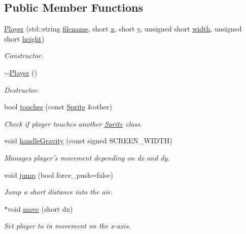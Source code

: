 \subsection*{Public Member Functions}
\begin{DoxyCompactItemize}
\item 
\hyperlink{classPlayer_a2a29c6c2f8635be96415c46c95881954}{Player} (std\-::string \hyperlink{classSprite_aae3514a9a1f77ab5e8e213e44ec618a3}{filename}, short \hyperlink{classSprite_a18eb1c5b90418641d3eabda8f7fe56c9}{x}, short \hyperlink{classSprite_afca2c03aad9d2526427470688ae76439}{y}, unsigned short \hyperlink{classSprite_ac56c9242f797a1a2f76687fca636a3c4}{width}, unsigned short \hyperlink{classSprite_ae96d42c46af7aad1f9031da62f878b21}{height})
\begin{DoxyCompactList}\small\item\em Constructor. \end{DoxyCompactList}\item 
\hyperlink{classPlayer_a749d2c00e1fe0f5c2746f7505a58c062}{$\sim$\-Player} ()
\begin{DoxyCompactList}\small\item\em Destructor. \end{DoxyCompactList}\item 
bool \hyperlink{classPlayer_a83bceadff4531bcd4d8a1112bdd9761c}{touches} (const \hyperlink{classSprite}{Sprite} \&other)
\begin{DoxyCompactList}\small\item\em Check if player touches another \hyperlink{classSprite}{Sprite} class. \end{DoxyCompactList}\item 
void \hyperlink{classPlayer_a27fc37febc547d8d030b24ddae6c10cf}{handle\-Gravity} (const signed S\-C\-R\-E\-E\-N\-\_\-\-W\-I\-D\-T\-H)
\begin{DoxyCompactList}\small\item\em Manages player's movement depending on dx and dy. \end{DoxyCompactList}\item 
void \hyperlink{classPlayer_a1304b1190f969212483e81ae85e86282}{jump} (bool force\-\_\-push=false)
\begin{DoxyCompactList}\small\item\em Jump a short distance into the air. \end{DoxyCompactList}\item 
$\ast$void \hyperlink{classPlayer_ae9c07ea7f8980451fc2070bb5a76f06f}{move} (short dx)
\begin{DoxyCompactList}\small\item\em Set player to in movement on the x-\/axis. \end{DoxyCompactList}\end{DoxyCompactItemize}

